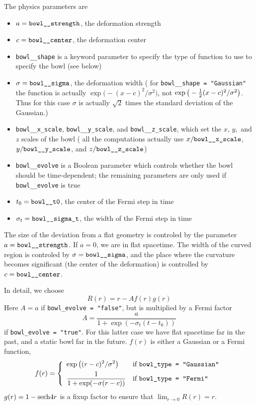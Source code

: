 The physics parameters are
\begin{itemize}
\item	$a = \verb|bowl__strength|$, the deformation strength
\item	$c = \verb|bowl__center|$, the deformation center
\item	\verb|bowl__shape| is a keyword parameter to specify
	the type of function to use to specify the bowl (see below)
\item	$\sigma = \verb|bowl__sigma|$, the deformation width
	(\Nb{} for \verb|bowl__shape = "Gaussian"| the function
	is actually $\exp \big( \!-(x-c)^2/\sigma^2 \big)$, not
	$\exp \big( -{\textstyle \frac{1}{2}}(x-c)^2/\sigma^2 \big)$.  Thus for
	this case $\sigma$ is actually $\sqrt{2}$ times the
	standard deviation of the Gaussian.)
\item	\verb|bowl__x_scale|, \verb|bowl__y_scale|, and \verb|bowl__z_scale|,
	which set the $x$, $y,$ and $z$ scales of the bowl
	(\ie{} all the computations actually use $x/\verb|bowl__x_scale|$,
	$y/\verb|bowl__y_scale|$, and $z/\verb|bowl__z_scale|$)
\item	\verb|bowl__evolve| is a Boolean parameter which controls
	whether the bowl should be time-dependent; the remaining
	parameters are only used if \verb|bowl__evolve| is true
\item	$t_0 = \verb|bowl__t0|$, the center of the Fermi step in time
\item	$\sigma_t = \verb|bowl__sigma_t|$, the width of the Fermi step in time
\end{itemize}

The size of the deviation from a flat geometry is controled by the
parameter $a = \verb|bowl__strength|$.  If $a = 0$, we are in flat spacetime.
The width of the curved region is controled by $\sigma = \verb|bowl__sigma|$,
and the place where the curvature becomes significant (the center of
the deformation) is controlled by $c = \verb|bowl__center|$.

In detail, we choose
\begin{equation}
R(r) = r - A f(r) g(r)
\end{equation}
Here $A = a$ if \verb|bowl_evolve = "false"|, but is multiplied by
a Fermi factor
\begin{equation}
A = \frac{a}{1 + \exp(-\sigma_t(t-t_0))}
\end{equation}
if \verb|bowl_evolve = "true"|.  For this latter case we have
flat spacetime far in the past, and a static bowl far in the future.
$f(r)$ is either a Gaussian or a Fermi function,
\begin{equation}
f(r) = \left\{
       \begin{array}{ll}
       \displaystyle
       \exp \big( (r-c)^2/\sigma^2 \big)
			& \hbox{if {\tt bowl\_type = "Gaussian"}}	\\[1ex]
       \displaystyle
       \frac{1}{1 + \exp(-\sigma(r-c))}
			& \hbox{if {\tt bowl\_type = "Fermi"}}		%
       \end{array}
       \right.
\end{equation}
$g(r) = 1 - \text{sech} 4r$ is a fixup factor to ensure that
$\displaystyle \lim_{r \to 0} R(r) = r$.

